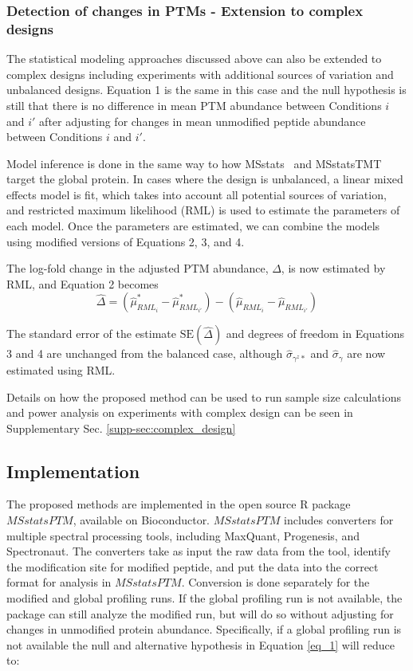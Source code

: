\documentclass[mcp]{article}
\numberwithin{table}{section}
\begin{document}
\subsubsection*{Detection of changes in PTMs - Extension to complex designs}

The statistical modeling approaches discussed above can also be extended to complex designs including experiments with additional sources of variation and unbalanced designs. Equation 1 is the same in this case and the null hypothesis is still that there is no difference in mean PTM abundance between Conditions $i$ and $i'$ after adjusting for changes in mean unmodified peptide abundance between Conditions $i$ and $i'$. 

Model inference is done in the same way to how MSstats~\cite{Choi:2014} and MSstatsTMT~\cite{Huang:2020} target the global protein. In cases where the design is unbalanced, a linear mixed effects model is fit, which takes into account all potential sources of variation, and restricted maximum likelihood (RML) is used to estimate the parameters of each model. Once the parameters are estimated, we can combine the models using modified versions of Equations 2, 3, and 4.

The log-fold change in the adjusted PTM abundance, $\Delta$, is now estimated by RML, and Equation 2 becomes 
\begin{equation}
\hat{\Delta} = (\hat{\mu}_{RML_i}^{\ast} - \hat{\mu}_{RML_{i'}}^{\ast}) - (\hat{\mu}_{RML_i} - \hat{\mu}_{RML_{i'}})
\end{equation}

The standard error of the estimate $\mathrm{SE}(\hat{\Delta})$ and degrees of freedom in Equations 3 and 4 are unchanged from the balanced case, although $\hat{\sigma}_{\gamma^z\ast}$ and $\hat{\sigma}_{\gamma}$ are now estimated using RML.

Details on how the proposed method can be used to run sample size calculations and power analysis on experiments with complex design can be seen in Supplementary Sec. \ref{supp-sec:complex_design}

\subsection*{Implementation}

The proposed methods are implemented in the open source R package $MSstatsPTM$, available on Bioconductor. $MSstatsPTM$ includes converters for multiple spectral processing tools, including MaxQuant, Progenesis, and Spectronaut. The converters take as input the raw data from the tool, identify the modification site for modified peptide, and put the data into the correct format for analysis in $MSstatsPTM$. Conversion is done separately for the modified and global profiling runs. If the global profiling run is not available, the package can still analyze the modified run, but will do so without adjusting for changes in unmodified protein abundance. Specifically, if a global profiling run is not available the null and alternative hypothesis in Equation \ref{eq_1} will reduce to:
\end{document}
